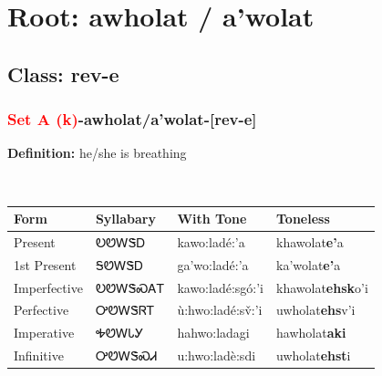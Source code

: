 \needspace{4in}
\section*{Root: awholat / a'wolat}
\nopagebreak
{}
\needspace{3in}
\subsection*{Class: rev-e}
\nopagebreak
\needspace{2in}
\subsubsection*{\textcolor{Red}{Set A (k)}{-}\textbf{awholat/a'wolat}{-}[rev-e]}
\nopagebreak
\textbf{Definition: } he/she is breathing
\\[0.5em]
\begin{tabularx}{\textwidth}{l X X X}%
\toprule%
\textbf{Form}&\textbf{Syllabary}&\textbf{With Tone}&\textbf{Toneless}\\%
\midrule%
Present&ᎧᏬᎳᏕᎠ&kawo:ladé:’a&khawolat\textbf{e'}a\\%
1st Present&ᎦᏬᎳᏕᎠ&ga’wo:ladé:’a&ka'wolat\textbf{e'}a\\%
Imperfective&ᎧᏬᎳᏕᏍᎪᎢ&kawo:ladé:sgó:’i&khawolat\textbf{ehsk}o'i\\%
Perfective&ᎤᏬᎳᏕᏒᎢ&ù:hwo:ladé:sv̌:’i&uwholat\textbf{ehs}v'i\\%
Imperative&ᎭᏬᎳᏓᎩ&hahwo:ladagi&hawholat\textbf{aki}\\%
Infinitive&ᎤᏬᎳᏕᏍᏗ&u:hwo:ladè:sdi&uwholat\textbf{ehst}i\\%
\bottomrule%
\end{tabularx}
\\[1em]